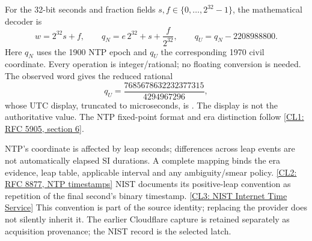 For the 32-bit seconds and fraction fields $s,f\in\{0,\ldots,2^{32}-1\}$,
the mathematical decoder is
\begin{equation}
 w=2^{32}s+f,\qquad
 q_N=e\,2^{32}+s+\frac{f}{2^{32}},\qquad
 q_U=q_N-2208988800 .
 \label{eq:r14-ntp-rational}
\end{equation}
Here $q_N$ uses the 1900 NTP epoch and $q_U$ the corresponding 1970 civil
coordinate. Every operation is integer/rational; no floating conversion is
needed. The observed word gives the reduced rational
\begin{equation}
 q_U=\frac{7685678632232377315}{4294967296},
 \label{eq:r14-observed-rational}
\end{equation}
whose UTC display, truncated to microseconds, is
. The display is not the authoritative value.
The NTP fixed-point format and era distinction follow
\href{https://www.rfc-editor.org/rfc/rfc5905.html#section-6}{[CL1: RFC 5905, section 6]}.

NTP's coordinate is affected by leap seconds; differences across leap events
are not automatically elapsed SI durations. A complete mapping binds the
era evidence, leap table, applicable interval and any ambiguity/smear policy.
\href{https://www.rfc-editor.org/rfc/rfc8877.html#section-4.2.1}{[CL2: RFC 8877, NTP timestamps]}
NIST documents its positive-leap convention as repetition of the final
second's binary timestamp.
\href{https://www.nist.gov/pml/time-and-frequency-division/time-distribution/internet-time-service-its}{[CL3: NIST Internet Time Service]}
This convention is part of the source identity; replacing the provider does
not silently inherit it. The earlier Cloudflare capture is retained separately
as acquisition provenance; the NIST record is the selected latch.

